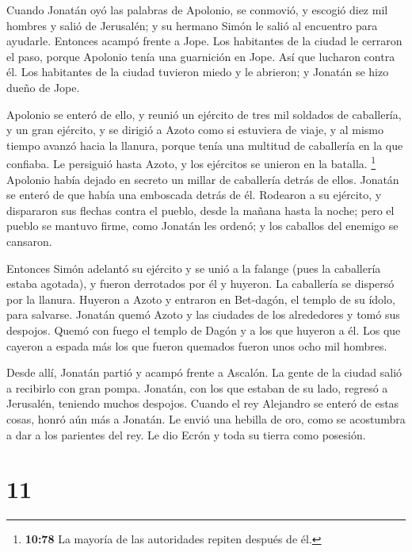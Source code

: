  Cuando Jonatán oyó las palabras de Apolonio, se
conmovió, y escogió diez mil hombres y salió de Jerusalén; y su hermano
Simón le salió al encuentro para ayudarle.  Entonces
acampó frente a Jope. Los habitantes de la ciudad le cerraron el paso,
porque Apolonio tenía una guarnición en Jope.  Así que
lucharon contra él. Los habitantes de la ciudad tuvieron miedo y le
abrieron; y Jonatán se hizo dueño de Jope.

 Apolonio se enteró de ello, y reunió un ejército de tres
mil soldados de caballería, y un gran ejército, y se dirigió a Azoto
como si estuviera de viaje, y al mismo tiempo avanzó hacia la llanura,
porque tenía una multitud de caballería en la que confiaba.
 Le persiguió hasta Azoto, y los ejércitos se unieron en
la batalla. \footnote{\textbf{10:78} La mayoría de las autoridades
  repiten después de él.}  Apolonio había dejado en
secreto un millar de caballería detrás de ellos.  Jonatán
se enteró de que había una emboscada detrás de él. Rodearon a su
ejército, y dispararon sus flechas contra el pueblo, desde la mañana
hasta la noche;  pero el pueblo se mantuvo firme, como
Jonatán les ordenó; y los caballos del enemigo se cansaron.

 Entonces Simón adelantó su ejército y se unió a la
falange (pues la caballería estaba agotada), y fueron derrotados por él
y huyeron.  La caballería se dispersó por la llanura.
Huyeron a Azoto y entraron en Bet-dagón, el templo de su ídolo, para
salvarse.  Jonatán quemó Azoto y las ciudades de los
alrededores y tomó sus despojos. Quemó con fuego el templo de Dagón y a
los que huyeron a él.  Los que cayeron a espada más los
que fueron quemados fueron unos ocho mil hombres.

 Desde allí, Jonatán partió y acampó frente a Ascalón. La
gente de la ciudad salió a recibirlo con gran pompa. 
Jonatán, con los que estaban de su lado, regresó a Jerusalén, teniendo
muchos despojos.  Cuando el rey Alejandro se enteró de
estas cosas, honró aún más a Jonatán.  Le envió una
hebilla de oro, como se acostumbra a dar a los parientes del rey. Le dio
Ecrón y toda su tierra como posesión.

\hypertarget{section-10}{%
\section{11}\label{section-10}}

